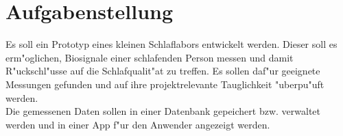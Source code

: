 \thispagestyle{empty}

\section {Aufgabenstellung} \label {Aufgabenstellung}

Es soll ein Prototyp eines kleinen Schlaflabors entwickelt werden. Dieser soll es erm"oglichen, Biosignale einer schlafenden Person messen und damit R"uckschl"usse auf die Schlafqualit"at zu treffen. Es sollen daf"ur geeignete Messungen gefunden und auf ihre projektrelevante Tauglichkeit "uberpu"uft werden. \\
Die gemessenen Daten sollen in einer Datenbank gepeichert bzw. verwaltet werden und in einer App f"ur den Anwender angezeigt werden. 

\thispagestyle{empty}